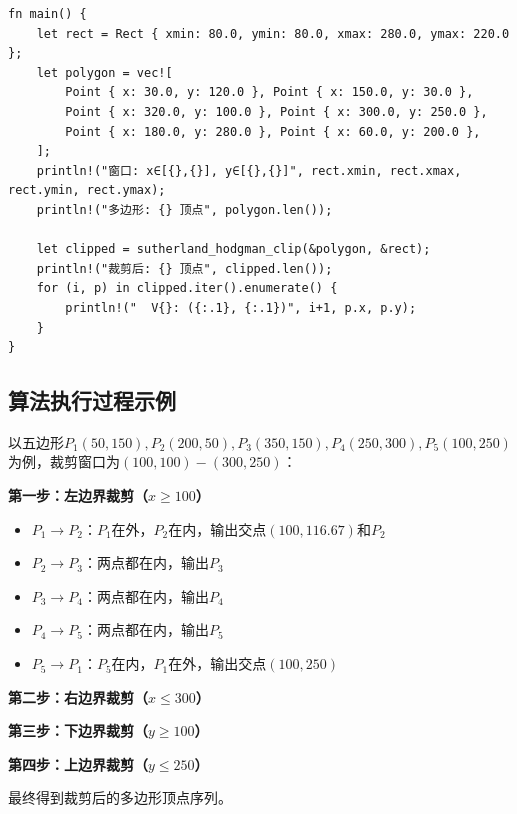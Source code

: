 \documentclass[12pt,a4paper]{article}
\begin{document}
\begin{lstlisting}
fn main() {
    let rect = Rect { xmin: 80.0, ymin: 80.0, xmax: 280.0, ymax: 220.0 };
    let polygon = vec![
        Point { x: 30.0, y: 120.0 }, Point { x: 150.0, y: 30.0 },
        Point { x: 320.0, y: 100.0 }, Point { x: 300.0, y: 250.0 },
        Point { x: 180.0, y: 280.0 }, Point { x: 60.0, y: 200.0 },
    ];
    println!("窗口: x∈[{},{}], y∈[{},{}]", rect.xmin, rect.xmax, rect.ymin, rect.ymax);
    println!("多边形: {} 顶点", polygon.len());
    
    let clipped = sutherland_hodgman_clip(&polygon, &rect);
    println!("裁剪后: {} 顶点", clipped.len());
    for (i, p) in clipped.iter().enumerate() {
        println!("  V{}: ({:.1}, {:.1})", i+1, p.x, p.y);
    }
}
\end{lstlisting}

\subsection{算法执行过程示例}

以五边形$P_1(50,150), P_2(200,50), P_3(350,150), P_4(250,300), P_5(100,250)$为例，裁剪窗口为$(100,100)-(300,250)$：

\textbf{第一步：左边界裁剪（$x \geq 100$）}
\begin{itemize}
    \item $P_1 \to P_2$：$P_1$在外，$P_2$在内，输出交点$(100, 116.67)$和$P_2$
    \item $P_2 \to P_3$：两点都在内，输出$P_3$
    \item $P_3 \to P_4$：两点都在内，输出$P_4$
    \item $P_4 \to P_5$：两点都在内，输出$P_5$
    \item $P_5 \to P_1$：$P_5$在内，$P_1$在外，输出交点$(100, 250)$
\end{itemize}

\textbf{第二步：右边界裁剪（$x \leq 300$）}

\textbf{第三步：下边界裁剪（$y \geq 100$）}

\textbf{第四步：上边界裁剪（$y \leq 250$）}

最终得到裁剪后的多边形顶点序列。
\end{document}
